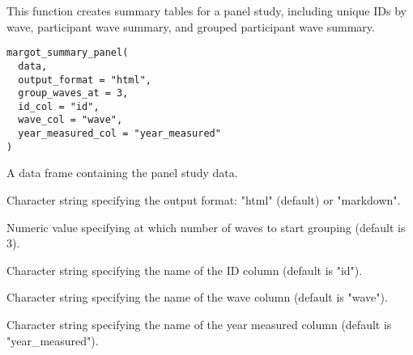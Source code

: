 \documentclass[a4paper]{book}
\begin{document}
%
\begin{Examples}
\end{Examples}
%
\begin{Description}
This function creates summary tables for a panel study, including unique IDs by wave,
participant wave summary, and grouped participant wave summary.
\end{Description}
%
\begin{Usage}
\begin{verbatim}
margot_summary_panel(
  data,
  output_format = "html",
  group_waves_at = 3,
  id_col = "id",
  wave_col = "wave",
  year_measured_col = "year_measured"
)
\end{verbatim}
\end{Usage}
%
\begin{Arguments}
\begin{ldescription}
\item[\code{data}] A data frame containing the panel study data.

\item[\code{output\_format}] Character string specifying the output format: "html" (default) or "markdown".

\item[\code{group\_waves\_at}] Numeric value specifying at which number of waves to start grouping (default is 3).

\item[\code{id\_col}] Character string specifying the name of the ID column (default is "id").

\item[\code{wave\_col}] Character string specifying the name of the wave column (default is "wave").

\item[\code{year\_measured\_col}] Character string specifying the name of the year measured column (default is "year\_measured").
\end{ldescription}
\end{Arguments}
\end{document}
